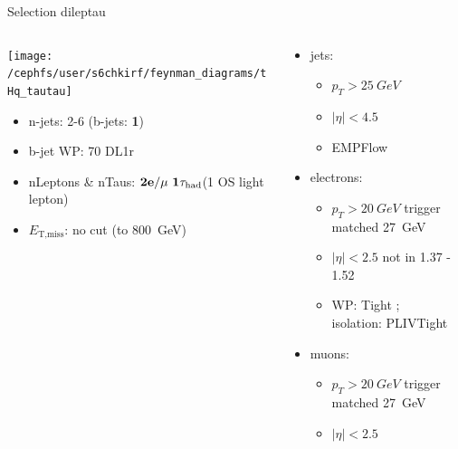 \begin{frame}{Selection dileptau}
  \begin{columns}
    \begin{column}{0.5\textwidth}
      \centering \texttt{[image: /cephfs/user/s6chkirf/feynman\_diagrams/tHq\_tautau]}\\
      \begin{itemize}
        \item n-jets: 2-6 (b-jets: \textbf{1})
        \item b-jet WP: 70 DL1r
        \item nLeptons \& nTaus: $\bf{2e / \mu~1\tau_{\text{had}}} $(1 OS light lepton)
        \item $E_{\text{T,miss}}$: no cut (to \SI{800}{GeV})
      \end{itemize}
    \end{column}
    \begin{column}{0.7\textwidth}
      \vspace*{-0.05\textwidth}
      \begin{itemize}
        \footnotesize
        \item jets:
        \vspace*{-0.02\textwidth}
        \begin{itemize}
          \footnotesize
          \item $p_T>\SI{25}{GeV}$
          \item $|\eta|<4.5$
          \item EMPFlow
        \end{itemize}
        \item electrons:
        \vspace*{-0.02\textwidth}
        \begin{itemize}
          \footnotesize
          \item $p_T>\SI{20}{GeV}$ trigger matched \SI{27}{GeV}
          \item $|\eta|<2.5$ not in 1.37 - 1.52
          \item WP: Tight ; \\isolation: PLIVTight
        \end{itemize}
        \item muons:
        \vspace*{-0.02\textwidth}
        \begin{itemize}
          \footnotesize
          \item $p_T>\SI{20}{GeV}$ trigger matched \SI{27}{GeV}
          \item $|\eta|<2.5$

\end{itemize}
\end{itemize}
\end{column}
\end{columns}
\end{frame}

